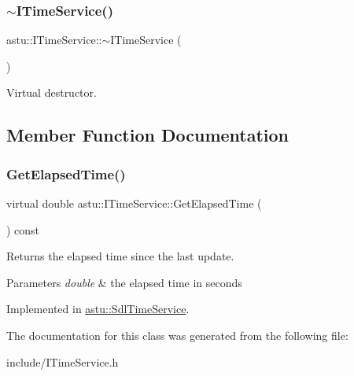 \subsubsection{\texorpdfstring{$\sim$\+I\+Time\+Service()}{~ITimeService()}}
{\footnotesize\ttfamily astu\+::\+I\+Time\+Service\+::$\sim$\+I\+Time\+Service (\begin{DoxyParamCaption}{ }\end{DoxyParamCaption})\hspace{0.3cm}{\ttfamily [inline]}}

Virtual destructor. 

\subsection{Member Function Documentation}
\mbox{\label{classastu_1_1ITimeService_af38c6c5f4fedc705c14b01f2c61b0afc}} 
\subsubsection{\texorpdfstring{Get\+Elapsed\+Time()}{GetElapsedTime()}}
{\footnotesize\ttfamily virtual double astu\+::\+I\+Time\+Service\+::\+Get\+Elapsed\+Time (\begin{DoxyParamCaption}{ }\end{DoxyParamCaption}) const\hspace{0.3cm}{\ttfamily [pure virtual]}}

Returns the elapsed time since the last update.


\begin{DoxyParams}{Parameters}
{\em double} & the elapsed time in seconds \\
\hline
\end{DoxyParams}


Implemented in \hyperlink{classastu_1_1SdlTimeService_a6652d19cae14e20ec85a1808fc8e87b7}{astu\+::\+Sdl\+Time\+Service}.



The documentation for this class was generated from the following file\+:\begin{DoxyCompactItemize}
\item 
include/I\+Time\+Service.\+h\end{DoxyCompactItemize}
